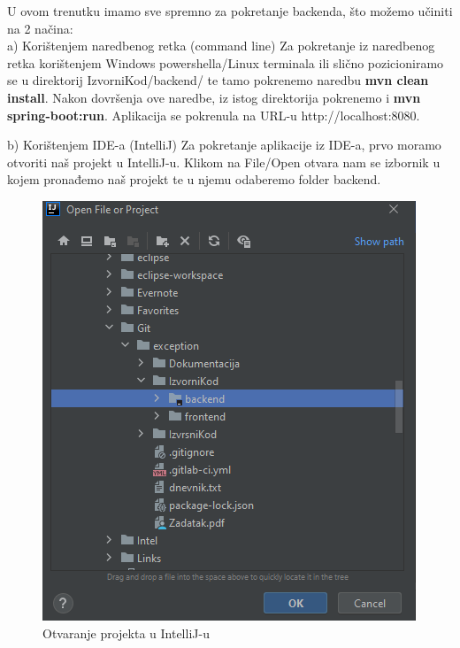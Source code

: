                     U ovom trenutku imamo sve spremno za pokretanje backenda, što možemo učiniti na 2 načina:\newline \\
                    
                    \noindent a) Korištenjem naredbenog retka (command line)
                    Za pokretanje iz naredbenog retka korištenjem Windows powershella/Linux terminala ili slično pozicioniramo se u direktorij IzvorniKod/backend/
                    te tamo pokrenemo naredbu \textbf{mvn clean install}. Nakon dovršenja ove naredbe, iz istog direktorija pokrenemo i \textbf{mvn spring-boot:run}. Aplikacija se pokrenula na URL-u http://localhost:8080.\newline

                    \noindent b) Korištenjem IDE-a (IntelliJ)
                    Za pokretanje aplikacije iz IDE-a, prvo moramo otvoriti naš projekt u IntelliJ-u. 
                    Klikom na File/Open otvara nam se izbornik u kojem pronađemo naš projekt te u njemu odaberemo folder backend.
                    
                    \begin{figure}[H]
        				\includegraphics[scale=0.6]{slike/deploy_ideizbornik.PNG} 
        				\centering
        				\caption{Otvaranje projekta u IntelliJ-u}
        				\label{fig:sustav-prvi-slucaj}
        			\end{figure}
        			
